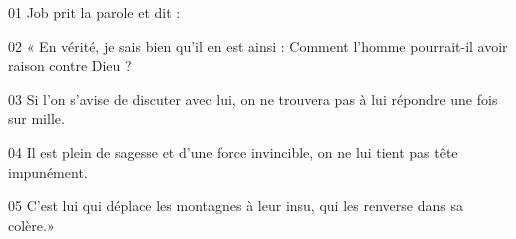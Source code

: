 01 Job prit la parole et dit :

02 « En vérité, je sais bien qu’il en est ainsi : Comment l’homme pourrait-il avoir raison contre Dieu ?

03 Si l’on s’avise de discuter avec lui, on ne trouvera pas à lui répondre une fois sur mille.

04 Il est plein de sagesse et d’une force invincible, on ne lui tient pas tête impunément.

05 C’est lui qui déplace les montagnes à leur insu, qui les renverse dans sa colère.»
